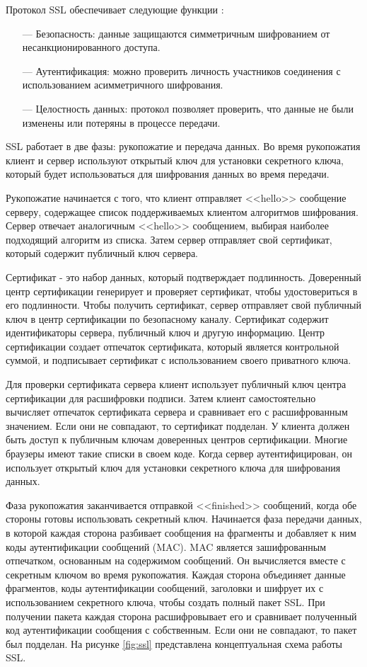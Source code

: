 Протокол SSL обеспечивает следующие функции \cite{ssl}:

\begin{itemize}
	\item [---] Безопасность: данные защищаются симметричным шифрованием от несанкционированного доступа.
	\item [---] Аутентификация: можно проверить личность участников соединения с использованием асимметричного шифрования.
	\item [---] Целостность данных: протокол позволяет проверить, что данные не были изменены или потеряны в процессе передачи.
\end{itemize}

SSL работает в две фазы: рукопожатие и передача данных. Во время рукопожатия клиент и сервер используют открытый ключ для установки секретного ключа, который будет использоваться для шифрования данных во время передачи.

Рукопожатие начинается с того, что клиент отправляет <<hello>> сообщение серверу, содержащее список поддерживаемых клиентом алгоритмов шифрования. Сервер отвечает аналогичным <<hello>> сообщением, выбирая наиболее подходящий алгоритм из списка. Затем сервер отправляет свой сертификат, который содержит публичный ключ сервера.

Сертификат - это набор данных, который подтверждает подлинность. Доверенный центр сертификации генерирует и проверяет сертификат, чтобы удостовериться в его подлинности. Чтобы получить сертификат, сервер отправляет свой публичный ключ в центр сертификации по безопасному каналу. Сертификат содержит идентификаторы сервера, публичный ключ и другую информацию. Центр сертификации создает отпечаток сертификата, который является контрольной суммой, и подписывает сертификат с использованием своего приватного ключа.

Для проверки сертификата сервера клиент использует публичный ключ центра сертификации для расшифровки подписи. Затем клиент самостоятельно вычисляет отпечаток сертификата сервера и сравнивает его с расшифрованным значением. Если они не совпадают, то сертификат подделан. У клиента должен быть доступ к публичным ключам доверенных центров сертификации. Многие браузеры имеют такие списки в своем коде. Когда сервер аутентифицирован, он использует открытый ключ для установки секретного ключа для шифрования данных.

Фаза рукопожатия заканчивается отправкой <<finished>> сообщений, когда обе стороны готовы использовать секретный ключ. Начинается фаза передачи данных, в которой каждая сторона разбивает сообщения на фрагменты и добавляет к ним коды аутентификации сообщений (MAC). MAC является зашифрованным отпечатком, основанным на содержимом сообщений. Он вычисляется вместе с секретным ключом во время рукопожатия. Каждая сторона объединяет данные фрагментов, коды аутентификации сообщений, заголовки и шифрует их с использованием секретного ключа, чтобы создать полный пакет SSL. При получении пакета каждая сторона расшифровывает его и сравнивает полученный код аутентификации сообщения с собственным. Если они не совпадают, то пакет был подделан. На рисунке \ref{fig:ssl} представлена концептуальная схема работы SSL.

